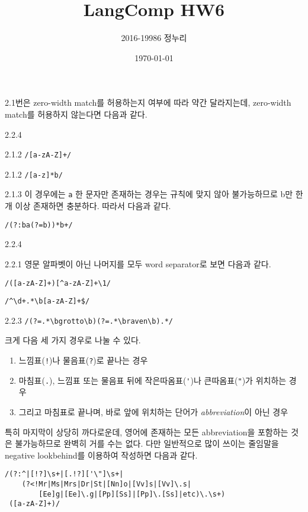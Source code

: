 \documentclass[a4paper,11pt]{scrartcl}
\title{\vspace{-0.5in}LangComp HW6}
\author{\vspace{-15pt}2016-19986 정누리}
\date{\vspace{-5pt}\today}
\begin{document}
\maketitle

\noindent 2.1번은 zero-width match를 허용하는지 여부에 따라 약간 달라지는데, zero-width match를 허용하지 않는다면 다음과 같다.

\begin{labeling}{2.2.4}
  \item[2.1.2] \texttt{/[a-zA-Z]+/}
  \item[2.1.2] \texttt{/[a-z]*b/}
  \item[2.1.3] 이 경우에는 \texttt{a} 한 문자만 존재하는 경우는 규칙에 맞지 않아 불가능하므로 b만 한 개 이상 존재하면 충분하다. 따라서 다음과 같다.

  \texttt{/(?:ba(?=b))*b+/}
\end{labeling}

\bigskip

\begin{labeling}{2.2.4}
  \item[2.2.1] 영문 알파벳이 아닌 나머지를 모두 word separator로 보면 다음과 같다.

  \lstinline{/([a-zA-Z]+)[^a-zA-Z]+\1/}

  \item[2.2.2] \lstinline{/^\d+.*\b[a-zA-Z]+$/}
  \item[2.2.3] \lstinline{/(?=.*\bgrotto\b)(?=.*\braven\b).*/}
  \item[2.2.4] 크게 다음 세 가지 경우로 나눌 수 있다.

    \begin{enumerate}[label=\theenumi)]
      \item 느낌표(\lstinline{!})나 물음표(\lstinline{?})로 끝나는 경우
      \item 마침표(\lstinline{.}), 느낌표 또는 물음표 뒤에 작은따옴표(\lstinline{'})나 큰따옴표(\lstinline{"})가 위치하는 경우
      \item 그리고 마침표로 끝나며, 바로 앞에 위치하는 단어가 \emph{abbreviation}이 아닌 경우
    \end{enumerate}

    특히 마지막이 상당히 까다로운데, 영어에 존재하는 모든 abbreviation을 포함하는 것은 불가능하므로 완벽히 거를 수는 없다. 다만 일반적으로 많이 쓰이는 줄임말을 negative lookbehind를 이용하여 작성하면 다음과 같다.

    \begin{lstlisting}
/(?:^|[!?]\s+|[.!?]['\"]\s+|
    (?<!Mr|Ms|Mrs|Dr|St|[Nn]o|[Vv]s|[Vv]\.s|
        [Ee]g|[Ee]\.g|[Pp][Ss]|[Pp]\.[Ss]|etc)\.\s+)
 ([a-zA-Z]+)/
    \end{lstlisting}
\end{labeling}
\end{document}
